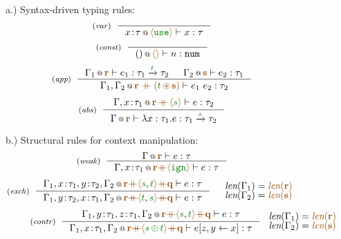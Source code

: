 \begin{figure}[t]
{\small a.) Syntax-driven typing rules:}
\begin{equation*}
\tyrule{var}
  { }
  {\coctx{x\!:\!\tau}{\alift{\cunit}} \vdash x : \tau }
\end{equation*}
\begin{equation*}
\tyrule{const}
  { }
  {\coctx{()}{\alift{}} \vdash n : \ident{num} }
\end{equation*}
\begin{equation*}
\tyrule{app}
  {\coctx{\Gamma_1}{\aclrd{\textbf{r}}} \vdash e_1 : \tau_1 \xrightarrow{\cclrd{t}} \tau_2 &
   \coctx{\Gamma_2}{\aclrd{\textbf{s}}} \vdash e_2 : \tau_1 }
  {\coctx{\Gamma_1, \Gamma_2}{\aclrd{\textbf{r}\;\atimes\;(\cclrd{t} \,\aseq\, \aclrd{\textbf{s}})}} \vdash e_1~e_2 : \tau_2}
\end{equation*}
\begin{equation*}
\tyrule{abs}
  {\coctx{\Gamma, x\!:\!\tau_1}{\aclrd{\textbf{r}}\,\atimes\,\alift{\cclrd{s}}} \vdash e : \tau_2}
  {\coctx{\Gamma}{\aclrd{\textbf{r}}} \vdash \lambda x:\tau_1.e : \tau_1 \xrightarrow{\cclrd{s}} \tau_2 }
\end{equation*}

\vspace{1em}
{\small b.) Structural rules for context manipulation:}
\begin{equation*}
\tyrule{weak}
  {\coctx{\Gamma}{ \aclrd{\textbf{r}} } \vdash e : \tau}
  {\coctx{\Gamma,x \!:\! \tau_1}{\aclrd{\textbf{r}} \atimes \alift{ \czero }} \vdash e : \tau}
\end{equation*}
\begin{equation*}
\tyrule{exch}
  {\coctx{\Gamma_1,x\!:\!\tau_1,y\!:\!\tau_2,\Gamma_2}{\aclrd{\textbf{r}} \atimes \alift{\cclrd{s},\cclrd{t}} \atimes \aclrd{\textbf{q}}} \vdash e : \tau}
  {\coctx{\Gamma_1,y\!:\!\tau_2,x\!:\!\tau_1,\Gamma_2}{\aclrd{\textbf{r}} \atimes \alift{\cclrd{t},\cclrd{s}} \atimes \aclrd{\textbf{q}}} \vdash e : \tau}
\quad
\begin{array}{l}
 \xlen{\Gamma_1} = \alen{\aclrd{\textbf{r}}}\\[-0.25em]
 \xlen{\Gamma_2} = \alen{\aclrd{\textbf{s}}}
\end{array}
\end{equation*}
\begin{equation*}
\hspace{2.5em}
\tyrule{contr}
  {\coctx{\Gamma_1,y\!:\!\tau_1,z\!:\!\tau_1,\Gamma_2}{\aclrd{\textbf{r}} \atimes \alift{\cclrd{s},\cclrd{t}} \atimes \aclrd{\textbf{q}}} \vdash e : \tau}
  {\coctx{\Gamma_1,x\!:\!\tau_1,\Gamma_2}{\aclrd{\textbf{r}} \atimes \alift{\cclrd{s} \,\cpar\, \cclrd{t}} \atimes \aclrd{\textbf{q}}} \vdash \subst{e}{z,y}{x} : \tau}
~
\begin{array}{l}
 \xlen{\Gamma_1} = \alen{\aclrd{\textbf{r}}}\\[-0.25em]
 \xlen{\Gamma_2} = \alen{\aclrd{\textbf{s}}}
\end{array}
\end{equation*}

\label{fig:struct-types}
\end{figure}

